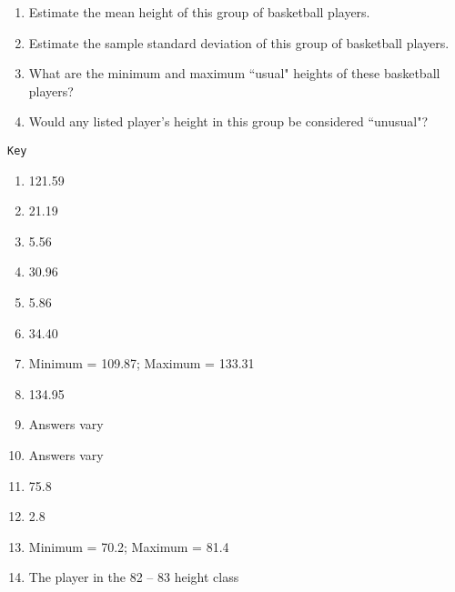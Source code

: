\documentclass{article}
\newcounter{pset}
\begin{document}
\begin{enumerate}   \setcounter{enumi}{\value{pset}}
    \item Estimate the mean height of this group of basketball players.
    \item Estimate the sample standard deviation of this group of basketball players.
    \item What are the minimum and maximum ``usual" heights of these basketball players?
    \item Would any listed player's height in this group be considered ``unusual"?
\end{enumerate}

\newpage 

\texttt{Key}

\begin{enumerate}
    \item 121.59
    \item 21.19
    \item 5.56
    \item 30.96
    \item 5.86
    \item 34.40
    \item Minimum = 109.87; Maximum = 133.31
    \item 134.95
    \item Answers vary
    \item Answers vary
    \item 75.8
    \item 2.8
    \item Minimum = 70.2; Maximum = 81.4
    \item The player in the 82 -- 83 height class
\end{enumerate}
\end{document}
